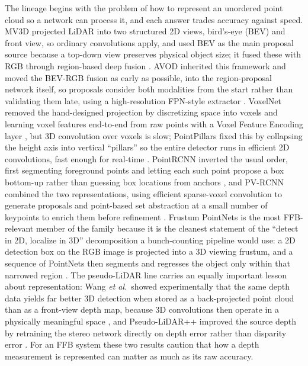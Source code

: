 The lineage begins with the problem of how to represent an unordered point cloud so a network can process it, and each answer trades accuracy against speed. MV3D projected LiDAR into two structured 2D views, bird's-eye (BEV) and front view, so ordinary convolutions apply, and used BEV as the main proposal source because a top-down view preserves physical object size; it fused these with RGB through region-based deep fusion \cite{chen2017mv3d}. AVOD inherited this framework and moved the BEV-RGB fusion as early as possible, into the region-proposal network itself, so proposals consider both modalities from the start rather than validating them late, using a high-resolution FPN-style extractor \cite{ku2018avod}. VoxelNet removed the hand-designed projection by discretizing space into voxels and learning voxel features end-to-end from raw points with a Voxel Feature Encoding layer \cite{zhou2018voxelnet}, but 3D convolution over voxels is slow; PointPillars fixed this by collapsing the height axis into vertical ``pillars'' so the entire detector runs in efficient 2D convolutions, fast enough for real-time \cite{lang2019pointpillars}. PointRCNN inverted the usual order, first segmenting foreground points and letting each such point propose a box bottom-up rather than guessing box locations from anchors \cite{shi2019pointrcnn}, and PV-RCNN combined the two representations, using efficient sparse-voxel convolution to generate proposals and point-based set abstraction at a small number of keypoints to enrich them before refinement \cite{shi2020pvrcnn}. Frustum PointNets is the most FFB-relevant member of the family because it is the cleanest statement of the ``detect in 2D, localize in 3D'' decomposition a bunch-counting pipeline would use: a 2D detection box on the RGB image is projected into a 3D viewing frustum, and a sequence of PointNets then segments and regresses the object only within that narrowed region \cite{qi2018frustum}. The pseudo-LiDAR line carries an equally important lesson about representation: Wang \textit{et al.}\ showed experimentally that the same depth data yields far better 3D detection when stored as a back-projected point cloud than as a front-view depth map, because 3D convolutions then operate in a physically meaningful space \cite{wang2019pseudolidar}, and Pseudo-LiDAR++ improved the source depth by retraining the stereo network directly on depth error rather than disparity error \cite{you2020pseudolidarpp}. For an FFB system these two results caution that how a depth measurement is represented can matter as much as its raw accuracy.


